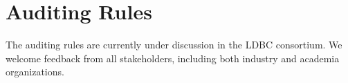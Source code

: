 \chapter{Auditing Rules}
\label{chap:auditing}

The auditing rules are currently under discussion in the LDBC consortium. We welcome feedback from all stakeholders, including both industry and academia organizations.
